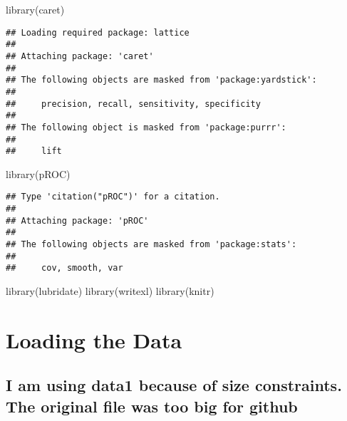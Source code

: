 \documentclass[
]{article}
\newenvironment{Shaded}{\begin{snugshade}}{\end{snugshade}}
\newcommand{\FunctionTok}[1]{\textcolor[rgb]{0.00,0.00,0.00}{#1}}
\newcommand{\NormalTok}[1]{#1}
\newcommand{\StringTok}[1]{\textcolor[rgb]{0.31,0.60,0.02}{#1}}
\begin{document}
\begin{Shaded}
\begin{Highlighting}[]
\FunctionTok{library}\NormalTok{(}\StringTok{\textquotesingle{}caret\textquotesingle{}}\NormalTok{)}
\end{Highlighting}
\end{Shaded}

\begin{verbatim}
## Loading required package: lattice
## 
## Attaching package: 'caret'
## 
## The following objects are masked from 'package:yardstick':
## 
##     precision, recall, sensitivity, specificity
## 
## The following object is masked from 'package:purrr':
## 
##     lift
\end{verbatim}

\begin{Shaded}
\begin{Highlighting}[]
\FunctionTok{library}\NormalTok{(}\StringTok{\textquotesingle{}pROC\textquotesingle{}}\NormalTok{)}
\end{Highlighting}
\end{Shaded}

\begin{verbatim}
## Type 'citation("pROC")' for a citation.
## 
## Attaching package: 'pROC'
## 
## The following objects are masked from 'package:stats':
## 
##     cov, smooth, var
\end{verbatim}

\begin{Shaded}
\begin{Highlighting}[]
\FunctionTok{library}\NormalTok{(}\StringTok{\textquotesingle{}lubridate\textquotesingle{}}\NormalTok{)}
\FunctionTok{library}\NormalTok{(}\StringTok{\textquotesingle{}writexl\textquotesingle{}}\NormalTok{)}
\FunctionTok{library}\NormalTok{(}\StringTok{\textquotesingle{}knitr\textquotesingle{}}\NormalTok{)}
\end{Highlighting}
\end{Shaded}

\hypertarget{loading-the-data}{%
\section{Loading the Data}\label{loading-the-data}}

\hypertarget{i-am-using-data1-because-of-size-constraints.-the-original-file-was-too-big-for-github}{%
\subsection{I am using data1 because of size constraints. The original
file was too big for
github}\label{i-am-using-data1-because-of-size-constraints.-the-original-file-was-too-big-for-github}}
\end{document}
